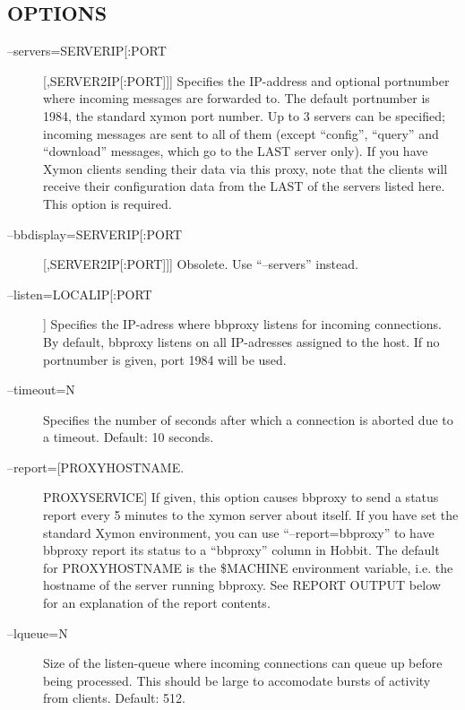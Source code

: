  
\subsection{OPTIONS}
\begin{description}
\item[--servers=SERVERIP[:PORT][,SERVER2IP[:PORT]]] Specifies the IP-address and optional portnumber where incoming messages are forwarded to. The default portnumber is 1984, the standard xymon port number. Up to 3 servers can be specified; incoming messages are sent to all of them (except ``config'', ``query'' and ``download'' messages, which go to the LAST server only). If you have Xymon clients sending their data via this proxy, note that the clients will receive their configuration data from the LAST of the servers listed here. This option is required. 

 

\item[--bbdisplay=SERVERIP[:PORT][,SERVER2IP[:PORT]]] Obsolete. Use ``--servers'' instead. 

 

\item[--listen=LOCALIP[:PORT]] Specifies the IP-adress where bbproxy listens for incoming connections. By default, bbproxy listens on all IP-adresses assigned to the host. If no portnumber is given, port 1984 will be used. 

 

\item[--timeout=N] Specifies the number of seconds after which a connection is aborted due to a timeout. Default: 10 seconds. 

 

\item[--report=[PROXYHOSTNAME.]PROXYSERVICE] If given, this option causes bbproxy to send a status report every 5 minutes to the xymon server about itself. If you have set the standard Xymon environment, you can use ``--report=bbproxy'' to have bbproxy report its status to a ``bbproxy'' column in Hobbit. The default for PROXYHOSTNAME is the \$MACHINE environment variable, i.e. the hostname of the server running bbproxy. See REPORT OUTPUT below for an explanation of the report contents. 

 

\item[--lqueue=N] Size of the listen-queue where incoming connections can queue up before being processed. This should be large to accomodate bursts of activity from clients. Default: 512. 


\end{description}
